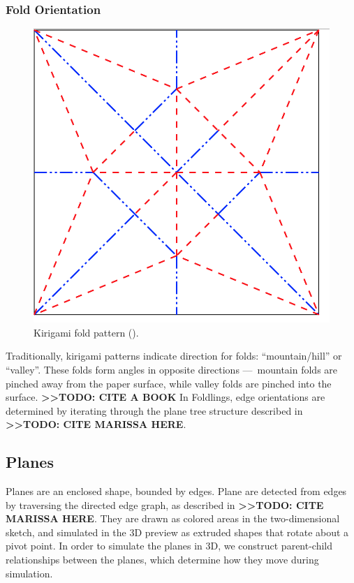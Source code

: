 \subsubsection{Fold Orientation}\label{fold-orientation}

\begin{figure}[htbp]
\centering
\includegraphics{figures/33_UI_Interface_Data_Structures/maekawas-theorem.png}
\caption{Kirigami fold pattern (\citet{maekawas-theorem}).}
\end{figure}

Traditionally, kirigami patterns indicate direction for folds:
``mountain/hill'' or ``valley''. These folds form angles in opposite
directions ---~mountain folds are pinched away from the paper surface,
while valley folds are pinched into the surface.
\textbf{\textgreater{}\textgreater{}TODO: CITE A BOOK} In Foldlings,
edge orientations are determined by iterating through the plane tree
structure described in \textbf{\textgreater{}\textgreater{}TODO: CITE
MARISSA HERE}.

\subsection{Planes}\label{planes}

Planes are an enclosed shape, bounded by edges. Plane are detected from
edges by traversing the directed edge graph, as described in
\textbf{\textgreater{}\textgreater{}TODO: CITE MARISSA HERE}. They are
drawn as colored areas in the two-dimensional sketch, and simulated in
the 3D preview as extruded shapes that rotate about a pivot point. In
order to simulate the planes in 3D, we construct parent-child
relationships between the planes, which determine how they move during
simulation.

